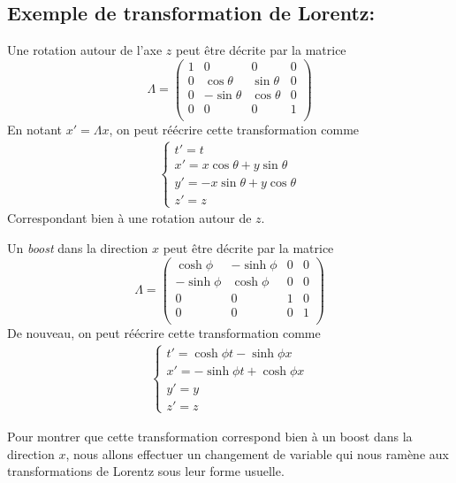 \subsection{Exemple de transformation de Lorentz:}

\begin{exmp}
    Une rotation autour de l'axe $z$ peut être décrite par la matrice
    \begin{equation}
        \Lambda = \begin{pmatrix}
1 & 0 & 0 & 0\\
0 & \cos{\theta} & \sin{\theta} & 0\\
0 & -\sin{\theta} & \cos{\theta} & 0\\
0 & 0 & 0 & 1\\
\end{pmatrix}
    \end{equation}
    En notant $x'=\Lambda x$, on peut réécrire cette transformation comme
    \begin{align}
    \left\{
\begin{array}{l}
  t' =t \\
  x' = x\cos{\theta} + y\sin{\theta}\\
  y' = -x\sin{\theta} + y\cos{\theta}\\
  z' = z
\end{array}
\right.
\end{align}
Correspondant bien à une rotation autour de $z$.
\end{exmp}


\begin{exmp}
    Un \textit{boost} dans la direction $x$ peut être décrite par la matrice
    \begin{equation}
        \Lambda = \begin{pmatrix}
\cosh{\phi}& -\sinh{\phi} & 0 & 0\\
-\sinh{\phi} & \cosh{\phi} & 0 & 0\\
0 & 0 & 1 & 0\\
0 & 0 & 0 & 1\\
\end{pmatrix}
    \end{equation}
    De nouveau, on peut réécrire cette transformation comme 
\begin{align}
\label{eq:4.2.1}
    \left\{
\begin{array}{l}
  t' = \cosh{\phi}t - \sinh{\phi}x \\
  x' = -\sinh{\phi}t + \cosh{\phi}x\\
  y' = y\\
  z' = z
\end{array}
\right.
\end{align}
\end{exmp}
Pour montrer que cette transformation correspond bien à un boost dans la direction $x$, nous allons effectuer un changement de variable qui nous ramène aux transformations de Lorentz sous leur forme usuelle.

